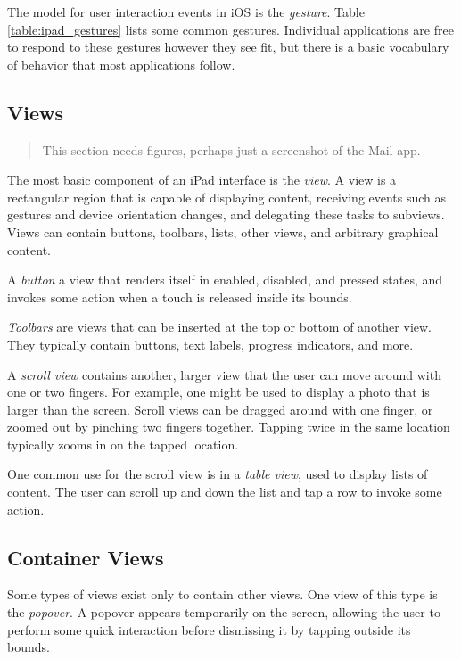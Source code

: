 The model for user interaction events in iOS is the \emph{gesture}. Table
\ref{table:ipad_gestures} lists some common gestures. Individual applications
are free to respond to these gestures however they see fit, but there is a basic
vocabulary of behavior that most applications follow.

\subsection{Views}
\label{sect:ipad_views}

\begin{quote}
    This section needs figures, perhaps just a screenshot of the Mail app.
\end{quote}

The most basic component of an iPad interface is the \emph{view}. A view is a
rectangular region that is capable of displaying content, receiving events such
as gestures and device orientation changes, and delegating these tasks to
subviews. Views can contain buttons, toolbars, lists, other views, and arbitrary
graphical content.

A \emph{button} a view that renders itself in enabled, disabled, and pressed
states, and invokes some action when a touch is released inside its bounds.

\emph{Toolbars} are views that can be inserted at the top or bottom of another
view. They typically contain buttons, text labels, progress indicators, and
more.

A \emph{scroll view} contains another, larger view that the user can move
around with one or two fingers. For example, one might be used to display a
photo that is larger than the screen. Scroll views can be dragged around with
one finger, or zoomed out by pinching two fingers together. Tapping twice in the
same location typically zooms in on the tapped location.

One common use for the scroll view is in a \emph{table view}, used to display
lists of content. The user can scroll up and down the list and tap a row to
invoke some action.

\subsection{Container Views}
\label{sect:ipad_container_views}

Some types of views exist only to contain other views. One view of this type is
the \emph{popover}. A popover appears temporarily on the screen, allowing the
user to perform some quick interaction before dismissing it by tapping outside
its bounds.

